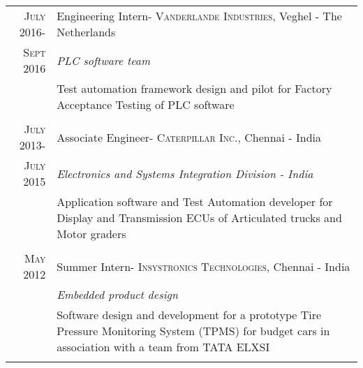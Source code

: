 \documentclass[a4paper,10pt]{article} %
\begin{document}
\begin{tabular}{r|p{13cm}}
\textsc{July 2016-} &Engineering Intern- \textsc{Vanderlande Industries}, Veghel - The Netherlands \\
\textsc{Sept 2016} & \emph{PLC software team}\\ 
& \footnotesize{Test automation framework design and pilot for Factory Acceptance Testing of PLC software}\\
\multicolumn{2}{c}{} \\


\textsc{July 2013-} &Associate Engineer- \textsc{Caterpillar Inc.}, Chennai - India \\
\textsc{July 2015} & \emph{Electronics and Systems Integration Division - India}\\ 
& \footnotesize{Application software and Test Automation developer for Display and Transmission ECUs of Articulated trucks and Motor graders}\\
\multicolumn{2}{c}{} \\


\textsc{May 2012} & Summer Intern- \textsc{Insystronics Technologies}, Chennai - India \emph{}\\
 & \emph{Embedded product design}\\
& \footnotesize{Software design and development for a prototype Tire Pressure Monitoring System (TPMS) for budget cars in association with a team from TATA ELXSI}\\
\multicolumn{2}{c}{} \\
\end{tabular}
%
%
\end{document}
